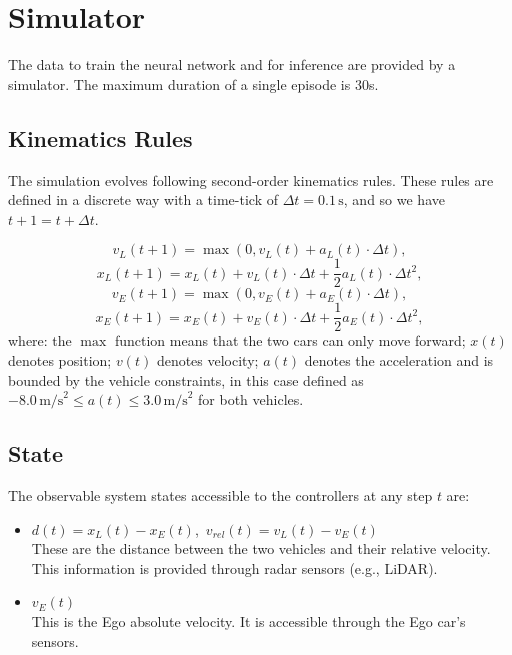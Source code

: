 \section{Simulator}
The data to train the neural network and for inference are provided by a simulator. The maximum duration of a single episode is 30s.

\subsection{Kinematics Rules}
The simulation evolves following second-order kinematics rules. These rules are defined in a discrete way with a time-tick of $\Delta t = 0.1\,\text{s}$, and so we have $t+1=t+\Delta t$.

\begin{equation}
v_L(t+1) = \max\left(0, v_L(t) + a_L(t) \cdot \Delta t\right),
\end{equation}
\begin{equation}
x_L(t+1) = x_L(t) + v_L(t) \cdot \Delta t + \frac{1}{2}a_L(t) \cdot \Delta t^2,
\end{equation}
\begin{equation}
v_E(t+1) = \max\left(0, v_E(t) + a_E(t) \cdot \Delta t\right),
\end{equation}
\begin{equation}
x_E(t+1) = x_E(t) + v_E(t) \cdot \Delta t + \frac{1}{2}a_E(t) \cdot \Delta t^2,
\end{equation}
where: the $\max$ function means that the two cars can only move forward; $x(t)$ denotes position; $v(t)$ denotes velocity; $a(t)$ denotes the acceleration and is bounded by the vehicle constraints, in this case defined as $-8.0 \,\text{m/s}^2 \le a(t) \le 3.0\,\text{m/s}^2$ for both vehicles.

\subsection{State}
The observable system states accessible to the controllers at any step $t$ are:
\begin{itemize}
    \item $d(t) = x_L(t) - x_E(t)$,\, $v_{rel}(t) = v_L(t) - v_E(t)$ \\
        These are the distance between the two vehicles and their relative velocity. This information is provided through radar sensors (e.g., LiDAR).
    \item $v_E(t)$ \\
        This is the Ego absolute velocity. It is accessible through the Ego car's sensors.
\end{itemize}

